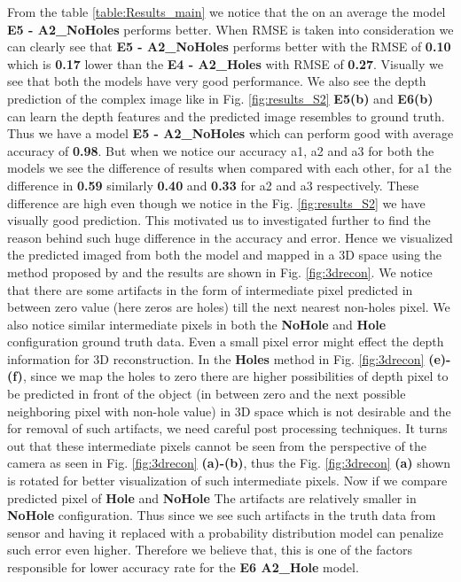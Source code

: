 From the table \ref{table:Results_main} we notice that the on an average the model \textbf{E5 - A2\_NoHoles} performs better. When RMSE is taken into consideration we can clearly see that \textbf{E5 - A2\_NoHoles} performs better with the RMSE of \textbf{0.10} which is \textbf{0.17} lower than the \textbf{E4 - A2\_Holes} with RMSE of \textbf{0.27}. Visually we see that both the models have very good performance. We also see the depth prediction of the complex image like in Fig. \ref{fig:results_S2} \textbf{E5(b)} and  \textbf{E6(b)} can learn the depth features and the predicted image resembles to ground truth. Thus we have a model \textbf{E5 - A2\_NoHoles} which can perform good with average accuracy of \textbf{0.98}. But when we notice our accuracy a1, a2 and a3 for both the models we see the difference of results when compared with each other, for a1 the difference in \textbf{0.59} similarly \textbf{0.40} and \textbf{0.33} for a2 and a3 respectively. These difference are high even though we notice in the Fig. \ref{fig:results_S2} we have visually good prediction. This motivated us to investigated further to find the reason behind such huge difference in the accuracy and error. Hence we visualized the predicted imaged from both the model and mapped in a 3D space using the method proposed by \cite{Zhou2018} and the results are shown in Fig. \ref{fig:3drecon}. We notice that there are some artifacts in the form of intermediate pixel predicted in between zero value (here zeros are holes) till the next nearest non-holes pixel. We also notice similar intermediate pixels in both the \textbf{NoHole} and \textbf{Hole} configuration ground truth data. Even a small pixel error might effect the depth information for 3D reconstruction. In the \textbf{Holes} method in Fig. \ref{fig:3drecon} \textbf{(e)-(f)}, since we map the holes to zero there are higher possibilities of depth pixel to be predicted in front of the object (in between zero and the next possible neighboring pixel with non-hole value) in 3D space which is not desirable and the for removal of such artifacts, we need careful post processing techniques. It turns out that these intermediate pixels cannot be seen from the perspective of the camera as seen in  Fig. \ref{fig:3drecon} \textbf{(a)-(b)}, thus the Fig. \ref{fig:3drecon} \textbf{(a)} shown is rotated for better visualization of such intermediate pixels. Now if we compare predicted pixel of \textbf{Hole} and \textbf{NoHole} The artifacts are relatively smaller in \textbf{NoHole} configuration. Thus since we see such artifacts in the truth data from sensor and having it replaced with a probability distribution model can penalize such error even higher. Therefore we believe that, this is one of the factors responsible for lower accuracy rate for the \textbf{E6 A2\_Hole} model. 


